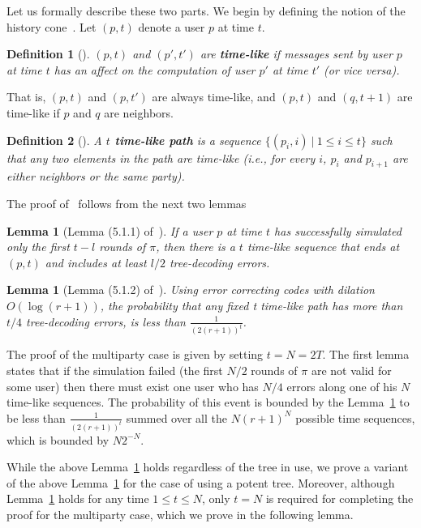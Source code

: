 \documentclass[ letterpaper, 11pt]{article}
\newtheorem{definition}{Definition}
\newtheorem{lemma}[theorem]{Lemma}
\newcommand{\potent}{potent\xspace}
\begin{document}
Let us formally describe these two parts.
We begin by defining the notion of the history cone~\cite{RS94}.
Let $(p,t)$ denote a user $p$ at time $t$.
\begin{definition}[\cite{RS94}]
$(p,t)$ and $(p',t')$ are \textbf{time-like} if messages sent by user $p$ at time $t$ has an affect on
the computation of user $p'$ at time $t'$ (or vice versa).
\end{definition}
That is, $(p,t)$ and $(p,t')$ are always time-like,
and $(p,t)$ and $(q,t+1)$ are time-like if $p$ and $q$ are neighbors.
\begin{definition}[\cite{RS94}]
A \textbf{$t$ time-like path} is a sequence $\{ (p_i,i)\ |\ 1\le i\le t\}$
such that  any two elements in the path are time-like
(i.e., for every $i$, $p_i$ and $p_{i+1}$ are either neighbors or the same party).
\end{definition}

The proof of~\cite{RS94} follows from the next two lemmas
\begin{lemma}[Lemma (5.1.1) of~\cite{RS94}]\label{lem:rsOne}
If a user $p$ at time $t$ has successfully simulated only the first $t-l$ rounds of $\pi$,
then there is a $t$ time-like sequence that ends at $(p,t)$ and
includes at least $l/2$ tree-decoding errors.
\end{lemma}
\begin{lemma}[Lemma (5.1.2) of~\cite{RS94}]\label{lem:rsTwo}
Using error correcting codes with dilation $O(\log(r+1))$,
the probability that any fixed t time-like path has more than
$t/4$ tree-decoding errors, is less than
$\frac{1}{(2(r+1))^t}$.
\end{lemma}
The proof of the multiparty case is given by setting $t=N=2T$.
The first lemma states that if the simulation failed
(the first $N/2$ rounds of $\pi$ are not valid for some user)
then there must exist one user who has $N/4$ errors along one of his $N$ time-like sequences.
The probability of this event is bounded by the Lemma~\ref{lem:rsTwo} to be
less than $\frac{1}{(2(r+1))^t}$ summed over
all the $N(r+1)^N$ possible time sequences, which is bounded by $N2^{-N}$.


While the above Lemma~\ref{lem:rsOne} holds regardless of the tree in use,
we prove a variant of the above Lemma~\ref{lem:rsTwo}
for the case of using a \potent tree.
Moreover, although Lemma~\ref{lem:rsTwo} holds for any time $1\le t\le N$, only $t=N$ is required
for completing the proof for the multiparty case, which we prove in the following lemma.
\end{document}
